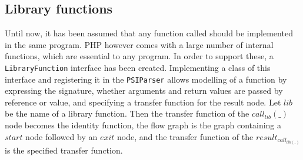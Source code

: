 \subsection{Library functions}
\label{subsec:libraryFunctions}
Until now, it has been assumed that any function called should be implemented in the same program. PHP however comes with a large number of internal functions, which are essential to any program. In order to support these, a \texttt{LibraryFunction} interface has been created. Implementing a class of this interface and registering it in the \texttt{PSIParser} allows modelling of a function by expressing the signature, whether arguments and return values are passed by reference or value, and specifying a transfer function for the result node. Let $\mathit{lib}$ be the name of a library function. Then the transfer function of the $\mathit{call}_\mathit{lib}(\_)$ node becomes the identity function, the flow graph is the graph containing a $\mathit{start}$ node followed by an $\mathit{exit}$ node, and the transfer function of the $\mathit{result}_{\mathit{call}_{\mathit{lib}(\_)}}$ is the specified transfer function. 

